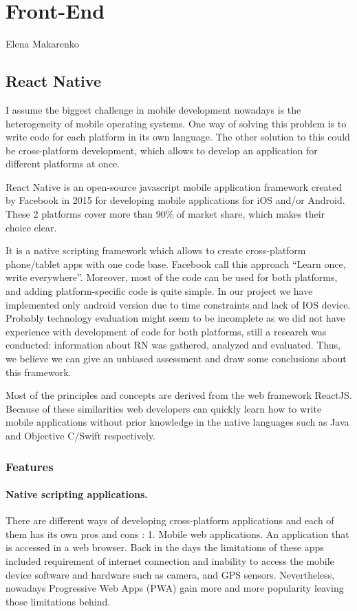 \section{Front-End}
Elena Makarenko

\subsection{React Native}
\vskip 0.1in
\indent
\indent
I assume the biggest challenge in mobile development nowadays is the heterogeneity of mobile operating systems. One way of solving this problem is to write code for each platform in its own language. The other solution to this could be cross-platform development, which allows to develop an application for different platforms at once. 

React Native is an open-source javascript mobile application framework created by Facebook in 2015 for developing mobile applications for iOS and/or Android. These 2 platforms cover more than 90\% of market share, which makes their choice clear.

It is a native scripting framework which allows to create cross-platform phone/tablet apps with one code base. Facebook call this approach “Learn once, write everywhere”. Moreover, most of the code can be used for both platforms, and adding platform-specific code is quite simple. In our project we have implemented only android version due to time constraints and lack of IOS device.
Probably technology evaluation might seem to be incomplete as we did not have experience with development of code for both platforms, still a research was conducted:
information about RN was gathered, analyzed and evaluated. 
Thus, we believe we can give an unbiased assessment and draw some conclusions about this framework. 

Most of the principles and concepts are derived from the web framework ReactJS. Because of these similarities web developers can quickly learn how to write mobile applications without prior knowledge in the native languages such as Java and Objective C/Swift respectively.

\subsubsection{Features}
\paragraph{Native scripting applications.}
\indent
\indent
There are different ways of developing cross-platform applications and each of them has its own pros and cons \cite{hansson2016effects}:
1. Mobile web applications.
An application that is accessed in a web browser. Back in the days the limitations of these apps included  requirement of internet connection and inability to access the mobile device software and hardware such as camera, and GPS sensors. Nevertheless, nowadays Progressive Web Apps (PWA) gain more and more popularity leaving those limitations behind.

